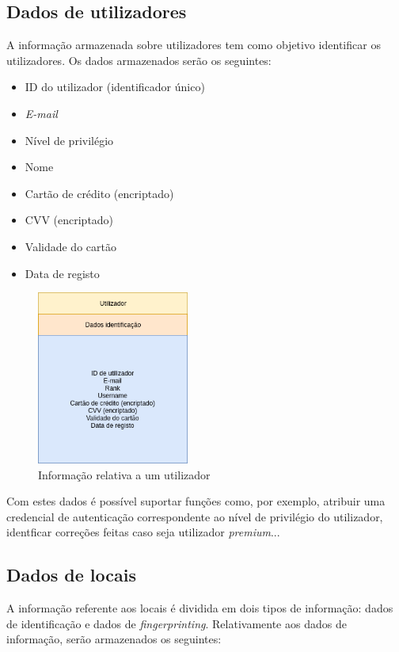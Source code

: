 \documentclass[12pt]{article} %
\begin{document}
\subsection{Dados de utilizadores}
A informação armazenada sobre utilizadores tem como objetivo identificar os utilizadores. Os dados armazenados serão os seguintes:

\begin{itemize}[noitemsep]
\item ID do utilizador (identificador único)
\item \textit{E-mail}
\item Nível de privilégio
\item Nome
\item Cartão de crédito (encriptado)
\item CVV (encriptado)
\item Validade do cartão
\item Data de registo
\end{itemize}

\pagebreak

\begin{figure}[!htbp]
  \centering
    \includegraphics[width=5cm]{modelodadosutilizador.png}
  \caption{Informação relativa a um utilizador}
\end{figure}

Com estes dados é possível suportar funções como, por exemplo, atribuir uma credencial de autenticação correspondente ao nível de privilégio do utilizador, identficar correções feitas caso seja utilizador \textit{premium}...

\pagebreak

\subsection{Dados de locais}
A informação referente aos locais é dividida em dois tipos de informação: dados de identificação e dados de \textit{fingerprinting}. Relativamente aos dados de informação, serão armazenados os seguintes:
\end{document}
